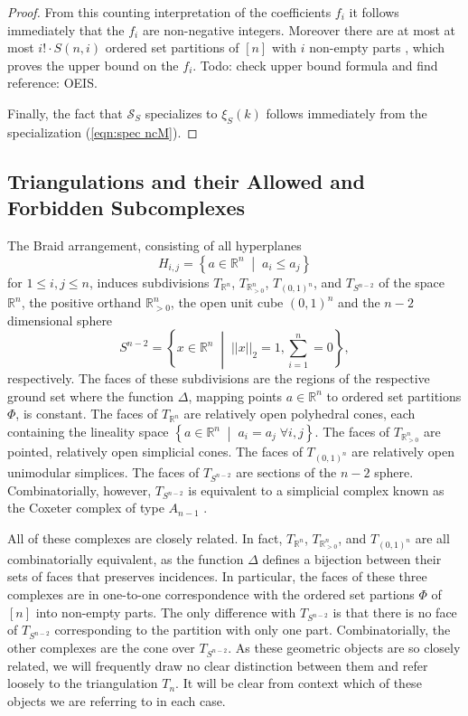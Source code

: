 \documentclass[12pt,reqno]{amsart}
\numberwithin{definition}{section}
\theoremstyle{definition}
\newcommand{\RR}{\mathbb{R}}
\newcommand{\SSS}{\mathcal{S}}
\newcommand{\mset}[2]{ \left\{ #1 \; \middle| \; #2 \right\}}
\newcommand{\T}{T} %
\newcommand{\Tn}{T_n} %
\newcommand{\TRn}{\T_{\RR^n}} %
\newcommand{\TS}{\T_{S^{n-2}}} %
\newcommand{\TP}{\T_{\RR^n_{> 0}}} %
\newcommand{\TC}{\T_{(0,1)^n}} %
\newcommand{\comment}[1]{\textsf{\footnotesize #1}}
\begin{document}
\begin{proof}
From this counting interpretation of the coefficients $f_i$ it follows immediately that the $f_i$ are non-negative integers. Moreover there are at most at most $i!\cdot S(n,i)$ ordered set partitions of $[n]$ with $i$ non-empty parts \cite{something}, which proves the upper bound on the $f_i$. \comment{Todo: check upper bound formula and find reference: OEIS.}

Finally, the fact that $\SSS_S$ specializes to $\xi_S(k)$ follows immediately from the specialization (\ref{eqn:spec ncM}).
\end{proof}

\subsection{Triangulations and their Allowed and Forbidden Subcomplexes}

The Braid arrangement, consisting of all hyperplanes
\[
  H_{i,j} = \mset{a\in\RR^n}{a_i \leq a_j}
\]
for $1\leq i,j\leq n$, induces subdivisions $\TRn$, $\TP$, $\TC$, and $\TS$ of the space $\RR^n$, the positive orthand $\RR^n_{> 0}$, the open unit cube $(0,1)^n$ and the $n-2$ dimensional sphere
\[
S^{n-2}=\mset{x\in\RR^n}{||x||_2 = 1, \sum_{i=1}^n = 0},
\]
respectively. The faces of these subdivisions are the regions of the respective ground set where the function $\Delta$, mapping points $a\in\RR^n$ to ordered set partitions $\Phi$, is constant. The faces of $\TRn$ are relatively open polyhedral cones, each containing the lineality space $\mset{a\in\RR^n}{a_i=a_j \; \forall i,j}$. The faces of $\TP$ are pointed, relatively open simplicial cones. The faces of $\TC$ are relatively open unimodular simplices. The faces of $\TS$ are sections of the $n-2$ sphere. Combinatorially, however, $\TS$ is equivalent to a simplicial complex known as the Coxeter complex of type $A_{n-1}$ \cite{something}.

All of these complexes are closely related. In fact, $\TRn$, $\TP$, and $\TC$ are all combinatorially equivalent, as the function $\Delta$ defines a bijection between their sets of faces that preserves incidences. In particular, the faces of these three complexes are in one-to-one correspondence with the ordered set partions $\Phi$ of $[n]$ into non-empty parts. The only difference with $\TS$ is that there is no face of $\TS$ corresponding to the partition with only one part. Combinatorially, the other complexes are the cone over $\TS$. As these geometric objects are so closely related, we will frequently draw no clear distinction between them and refer loosely to the triangulation $\Tn$. It will be clear from context which of these objects we are referring to in each case.
\end{document}
